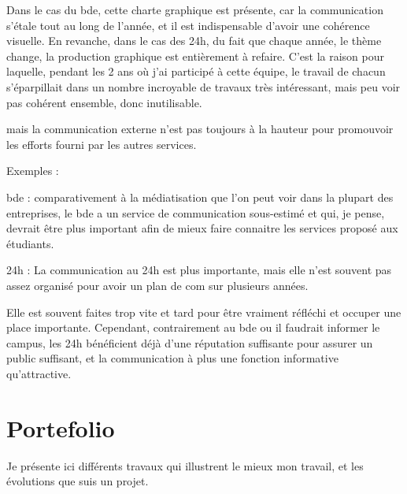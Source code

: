     Dans le cas du bde, cette charte graphique est présente, car la communication s'étale tout au long de l'année, et il est indispensable d'avoir une cohérence visuelle.
    En revanche, dans le cas des 24h, du fait que chaque année, le thème change, la production graphique est entièrement à refaire.
    C'est la raison pour laquelle, pendant les 2 ans où j'ai participé à cette équipe, le travail de chacun s'éparpillait dans un nombre incroyable de travaux très intéressant, mais peu voir pas cohérent ensemble, donc inutilisable.



     mais la communication externe n'est pas toujours à la hauteur pour promouvoir les efforts fourni par les autres services.

    Exemples :

        bde : comparativement à la médiatisation que l'on peut voir dans la plupart des entreprises, le bde a un service de communication sous-estimé et qui, je pense, devrait être plus important afin de mieux faire connaitre les services proposé aux étudiants.

        24h : La communication au 24h est plus importante, mais elle n'est souvent pas assez organisé pour avoir un plan de com sur plusieurs années.
        
    Elle est souvent faites trop vite et tard pour être vraiment réfléchi et occuper une place importante.
    Cependant, contrairement au bde ou il faudrait informer le campus, les 24h bénéficient déjà d'une réputation suffisante pour assurer un public suffisant, et la communication à plus une fonction informative qu'attractive.




\section{Portefolio}

    Je présente ici différents travaux qui illustrent le mieux mon travail, et les évolutions que suis un projet.
